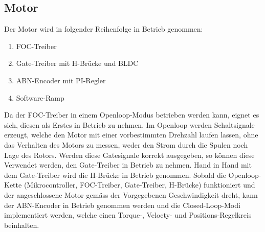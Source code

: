 \subsection{Motor}
\label{subsec:Inbetriebnahme_Motor}

Der Motor wird in folgender Reihenfolge in Betrieb genommen:

\begin{enumerate}
\item FOC-Treiber
\item Gate-Treiber mit H-Brücke und BLDC
\item ABN-Encoder mit PI-Regler
\item Software-Ramp
\end{enumerate}

Da der FOC-Treiber in einem Openloop-Modus betrieben werden kann, eignet es sich, diesen als Erstes in Betrieb zu nehmen. Im Openloop werden Schaltsignale erzeugt, welche den Motor mit einer vorbestimmten Drehzahl laufen lassen, ohne das Verhalten des Motors zu messen, weder den Strom durch die Spulen noch Lage des Rotors. Werden diese Gatesignale korrekt ausgegeben, so können diese Verwendet werden, den Gate-Treiber in Betrieb zu nehmen. Hand in Hand mit dem Gate-Treiber wird die H-Brücke in Betrieb genommen. Sobald die Openloop-Kette (Mikrocontroller, FOC-Treiber, Gate-Treiber, H-Brücke) funktioniert und der angeschlossene Motor gemäss der Vorgegebenen Geschwindigkeit dreht, kann der ABN-Encoder in Betrieb genommen werden und die Closed-Loop-Modi implementiert werden, welche einen Torque-, Velocty- und Positions-Regelkreis beinhalten.
